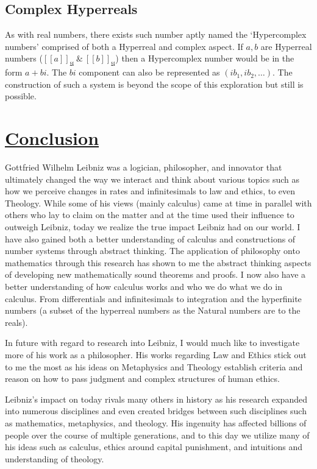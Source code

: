 \documentclass[12pt]{report}
\newcommand{\U}{\mathfrak{U}}
\begin{document}
\section*{Complex Hyperreals}
As with real numbers, there exists such number aptly named the ‘Hypercomplex numbers’ comprised of both a Hyperreal and complex aspect.
If $ a,b$ are Hyperreal numbers ($[[a]]_{\U} \  \& \  [[b]]_{\U}$) then a Hypercomplex number would be in the form $a+bi$.
The $bi $ component can also be represented as $(ib_1, ib_2,\ldots)$.
The construction of such a system is beyond the scope of this exploration but still is possible.


\chapter*{\underline{Conclusion}}
Gottfried Wilhelm Leibniz was a logician, philosopher, and innovator that ultimately changed the way we interact and think about various topics such as how we perceive changes in rates and infinitesimals to law and ethics, to even Theology.
While some of his views (mainly calculus) came at time in parallel with others who lay to claim on the matter and at the time used their influence to outweigh Leibniz, today we realize the true impact Leibniz had on our world.
I have also gained both a better understanding of calculus and constructions of number systems through abstract thinking.
The application of philosophy onto mathematics through this research has shown to me the abstract thinking aspects of developing new mathematically sound theorems and proofs.
I now also have a better understanding of how calculus works and who we do what we do in calculus.
From differentials and infinitesimals to integration and the hyperfinite numbers (a subset of the hyperreal numbers as the Natural numbers are to the reals).
\par


In future with regard to research into Leibniz, I would much like to investigate more of his work as a philosopher.
His works regarding Law and Ethics stick out to me the most as his ideas on Metaphysics and Theology establish criteria and reason on how to pass judgment and complex structures of human ethics. \par
Leibniz's impact on today rivals many others in history as his research expanded into numerous disciplines and even created bridges between such disciplines such as mathematics, metaphysics, and theology.
His ingenuity has affected billions of people over the course of multiple generations, and to this day we utilize many of his ideas such as calculus, ethics around capital punishment, and intuitions and understanding of theology.\par \\
\end{document}
